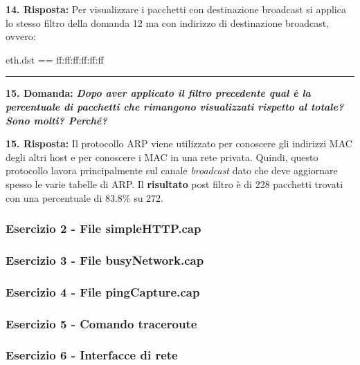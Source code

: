 \documentclass[a4paper]{article}
\newcommand{\longline}{\noindent\rule{\textwidth}{0.4pt}}
\begin{document}
	
	\noindent
	\textcolor{Green4}{\textbf{14. Risposta:}} Per visualizzare i pacchetti con destinazione broadcast si applica lo stesso filtro della domanda 12 ma con indirizzo di destinazione broadcast, ovvero:
	\begin{center}
		\textsf{eth.dst == ff:ff:ff:ff:ff:ff}
	\end{center}
	
	\longline
	
	\noindent
	\textcolor{Red3}{\textbf{15. Domanda:}} \textbf{\emph{Dopo aver applicato il filtro precedente qual è la percentuale di pacchetti che rimangono visualizzati rispetto al totale? Sono molti? Perché?}}\newline
	
	
	\noindent
	\textcolor{Green4}{\textbf{15. Risposta:}} Il protocollo ARP viene utilizzato per conoscere gli indirizzi MAC degli altri host e per conoscere i MAC in una rete privata. Quindi, questo protocollo lavora principalmente sul canale \emph{broadcast} dato che deve aggiornare spesso le varie tabelle di ARP. Il \textbf{risultato} post filtro è di 228 pacchetti trovati con una percentuale di 83.8\% su 272.\newpage
	
	\subsubsection{Esercizio 2 - File \textsf{simpleHTTP.cap}}
	
	\subsubsection{Esercizio 3 - File \textsf{busyNetwork.cap}}
	
	\subsubsection{Esercizio 4 - File \textsf{pingCapture.cap}}
	
	\subsubsection{Esercizio 5 - Comando \textsf{traceroute}}
	
	\subsubsection{Esercizio 6 - Interfacce di rete}
\end{document}
